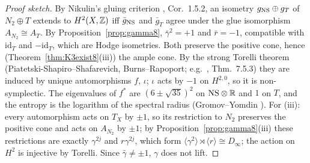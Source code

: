 \begin{proof}[Proof sketch]
By Nikulin's gluing criterion \cite{Nikulin}, Cor.~1.5.2, an isometry $g_{\rm NS}\oplus g_T$ of $N_2\oplus T$ extends to $H^2(X,\mathbb{Z})$ iff $\bar g_{\rm NS}$ and $\bar g_T$ agree under the glue isomorphism $A_{N_2}\cong A_T$. By Proposition~\ref{prop:gamma8}, $\bar\gamma^2=+1$ and $\bar r=-1$, compatible with $\mathrm{id}_T$ and $-\mathrm{id}_T$, which are Hodge isometries. Both preserve the positive cone, hence (Theorem~\ref{thm:K3exist8}(iii)) the ample cone. By the strong Torelli theorem (Piatetski-Shapiro--Shafarevich, Burns--Rapoport; e.g.\ \cite{Huybrechts}, Thm.~7.5.3) they are induced by unique automorphisms $f$, $\iota$; $\iota$ acts by $-1$ on $H^{2,0}$, so it is non-symplectic. The eigenvalues of $f^*$ are $(6\pm\sqrt{35})^2$ on $\mathrm{NS}\otimes\mathbb{R}$ and $1$ on $T$, and the entropy is the logarithm of the spectral radius (Gromov--Yomdin \cite{GY}). For (iii): every automorphism acts on $T_X$ by $\pm1$, so its restriction to $N_2$ preserves the positive cone and acts on $A_{N_2}$ by $\pm1$; by Proposition~\ref{prop:gamma8}(iii) these restrictions are exactly $\gamma^{2j}$ and $r\gamma^{2j}$, which form $\langle\gamma^2\rangle\rtimes\langle r\rangle\cong D_\infty$; the action on $H^2$ is injective by Torelli. Since $\bar\gamma\neq\pm1$, $\gamma$ does not lift.
\end{proof}


